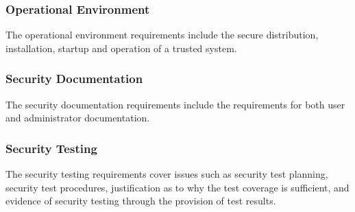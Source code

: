     \subsubsection{Operational Environment}
    The operational environment requirements include the secure distribution, installation,
    startup and operation of a trusted system.

    \subsubsection{Security Documentation}
    The security documentation requirements include the requirements for both user and administrator
    documentation.

    \subsubsection{Security Testing}
    The security testing requirements cover issues such as security test planning,
    security test procedures, justification as to why the test coverage is sufficient,
    and evidence of security testing through the provision of test results.

